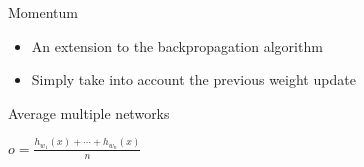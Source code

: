 \begin{frame}[c]{Momentum}
  \begin{itemize}
    \item An extension to the backpropagation algorithm
    \item Simply take into account the previous weight update
  \end{itemize}
\end{frame}

\begin{frame}{Average multiple networks}
\begin{center}
  \Large{$o = \frac{h_{w_1}(x) + \cdots + h_{w_n}(x)}{n}$}
\end{center}
\end{frame}

